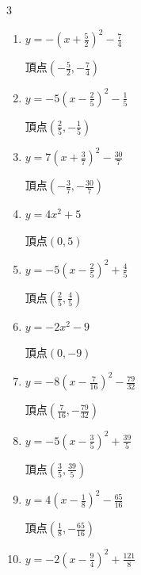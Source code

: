 \begin{multicols}{3}
\begin{enumerate}
        $\displaystyle 頂点\left( \frac{5}{18} , \frac{241}{36} \right)$

  \item $\displaystyle y=-\left( x+\frac{5}{2}\right)^{2}-\frac{7}{4}$

        $\displaystyle 頂点\left( -\frac{5}{2} , -\frac{7}{4} \right)$

\columnbreak %

  \item $\displaystyle y=-5\left( x-\frac{2}{5}\right)^{2}-\frac{1}{5}$

        $\displaystyle 頂点\left( \frac{2}{5} , -\frac{1}{5} \right)$

  \item $\displaystyle y=7\left( x+\frac{3}{7}\right)^{2}-\frac{30}{7}$

        $\displaystyle 頂点\left( -\frac{3}{7} , -\frac{30}{7} \right)$

  \item $\displaystyle y=4x^{2}+5$

        $\displaystyle 頂点\left( 0 , 5 \right)$

  \item $\displaystyle y=-5\left( x-\frac{2}{5}\right)^{2}+\frac{4}{5}$

        $\displaystyle 頂点\left( \frac{2}{5} , \frac{4}{5} \right)$

  \item $\displaystyle y=-2x^{2}-9$

        $\displaystyle 頂点\left( 0 , -9 \right)$

  \item $\displaystyle y=-8\left( x-\frac{7}{16}\right)^{2}-\frac{79}{32}$

        $\displaystyle 頂点\left( \frac{7}{16} , -\frac{79}{32} \right)$

  \item $\displaystyle y=-5\left( x-\frac{3}{5}\right)^{2}+\frac{39}{5}$

        $\displaystyle 頂点\left( \frac{3}{5} , \frac{39}{5} \right)$

  \item $\displaystyle y=4\left( x-\frac{1}{8}\right)^{2}-\frac{65}{16}$

        $\displaystyle 頂点\left( \frac{1}{8} , -\frac{65}{16} \right)$

  \item $\displaystyle y=-2\left( x-\frac{9}{4}\right)^{2}+\frac{121}{8}$


\end{enumerate}
\end{multicols}
